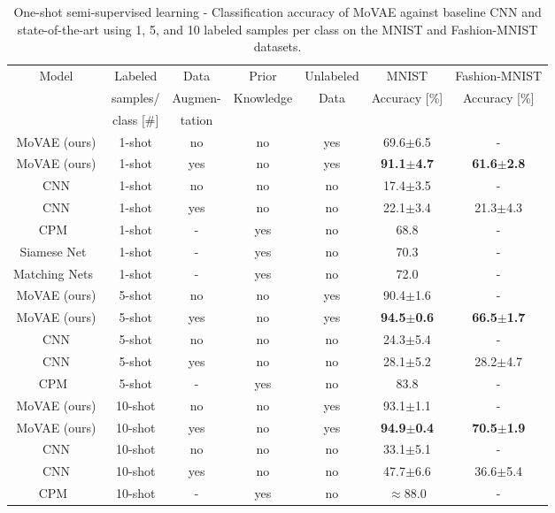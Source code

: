 \documentclass[sigconf,authorversion=true]{aamas}  %
\begin{document}
\begin{table}[t!]
\caption{One-shot semi-supervised learning - Classification accuracy of MoVAE against baseline CNN and state-of-the-art using 1, 5, and 10 labeled samples per class on the MNIST and Fashion-MNIST datasets.}
\scriptsize
\tabcolsep=0.06cm
\begin{tabular}{|c|c|c|c|c|c|c|}
\hline
Model&Labeled&Data&Prior&Unlabeled&MNIST&Fashion-MNIST\\
&samples/&Augmen-&Knowledge&Data&Accuracy [\%]&Accuracy [\%]\\
&class [\#]&tation&&&&\\
\hline
\hline
MoVAE (ours)&1-shot&no&no&yes&69.6$\pm$6.5&-\\
MoVAE (ours)&1-shot&yes&no&yes&\textbf{91.1$\pm$4.7}&\textbf{61.6$\pm$2.8}\\
CNN&1-shot&no&no&no&17.4$\pm$3.5&-\\
CNN&1-shot&yes&no&no&22.1$\pm$3.4&21.3$\pm$4.3\\
CPM~\cite{wong2015one}&1-shot&-&yes&no&68.8&-\\
Siamese Net~\cite{Koch2015SiameseNN}&1-shot&-&yes&no&70.3&-\\
Matching Nets~\cite{VinyalsBLKW16}&1-shot&-&yes&no&72.0&-\\
\hline
MoVAE (ours)&5-shot&no&no&yes&90.4$\pm$1.6&-\\
MoVAE (ours)&5-shot&yes&no&yes&\textbf{94.5$\pm$0.6}&\textbf{66.5$\pm$1.7}\\
CNN&5-shot&no&no&no&24.3$\pm$5.4&-\\
CNN&5-shot&yes&no&no&28.1$\pm$5.2&28.2$\pm$4.7\\
CPM~\cite{wong2015one}&5-shot&-&yes&no&83.8&-\\
\hline
MoVAE (ours)&10-shot&no&no&yes&93.1$\pm$1.1&-\\
MoVAE (ours)&10-shot&yes&no&yes&\textbf{94.9$\pm$0.4}&\textbf{70.5$\pm$1.9}\\
CNN&10-shot&no&no&no&33.1$\pm$5.1&-\\
CNN&10-shot&yes&no&no&47.7$\pm$6.6&36.6$\pm$5.4\\
CPM~\cite{wong2015one}&10-shot&-&yes&no&$\approx$88.0&-\\
\hline
\end{tabular}
\label{tab:oneshotmnist}

\end{table}
\end{document}
